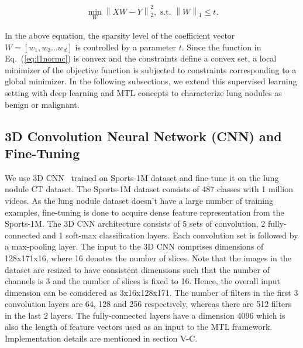 \documentclass[journal]{IEEEtran}
\DeclareMathOperator*{\minimum}{min}
\begin{document}
\begin{equation}
\begin{split}
\minimum_{W}  \left \|XW-Y  \right \|_{2}^{2},
\text{ s.t. }   \left \| W \right \|_1 \leq t.
\end{split}
\label{eq:l1normc}
\end{equation}

In the above equation, the sparsity level of the coefficient vector $W=[w_1,w_2 \dots w_d]$ is controlled by a parameter $t$. Since the function in Eq.~(\ref{eq:l1normc}) is convex and the constraints define a convex set, a local minimizer of the objective function is subjected to constraints corresponding to a global minimizer. In the following subsections, we extend this supervised learning setting with deep learning and MTL concepts to characterize lung nodules as benign or malignant.

\subsection{3D Convolution Neural Network (CNN) and Fine-Tuning}
We use 3D CNN~\cite{tran2015learning} trained on Sports-1M dataset \cite{karpathy2014large} and fine-tune it on the lung nodule CT dataset. The Sports-1M dataset consists of 487 classes with 1 million videos. As the lung nodule dataset doesn't have a large number of training examples, fine-tuning is done to acquire dense feature representation from the Sports-1M. The 3D CNN architecture consists of 5 sets of convolution, 2 fully-connected and 1 soft-max classification layers. Each convolution set is followed by a max-pooling layer. The input to the 3D CNN comprises dimensions of 128x171x16, where 16 denotes the number of slices. Note that the images in the dataset are resized to have consistent dimensions such that the number of channels is 3 and the number of slices is fixed to 16. Hence, the overall input dimension can be considered as 3x16x128x171. The number of filters in the first 3 convolution layers are 64, 128 and 256 respectively, whereas there are 512 filters in the last 2 layers. The fully-connected layers have a dimension 4096 which is also the length of feature vectors used as an input to the MTL framework. Implementation details are mentioned in section V-C.
\end{document}
